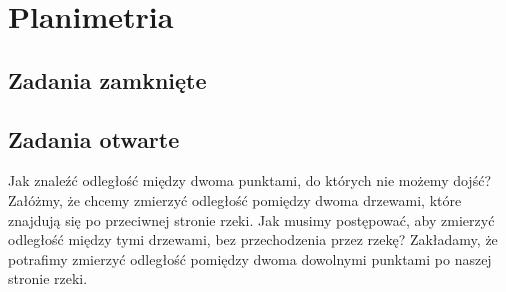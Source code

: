 \setcounter{parc}{0}
\addtocounter{chapc}{1}

\chapter{Planimetria}

\section{Zadania zamknięte}

\section{Zadania otwarte}

\zadanie Jak znaleźć odległość między dwoma punktami, do których nie możemy dojść? Załóżmy, że chcemy zmierzyć odległość pomiędzy dwoma drzewami, które znajdują się po przeciwnej stronie rzeki. Jak musimy postępować, aby zmierzyć odległość między tymi drzewami, bez przechodzenia przez rzekę? Zakładamy, że potrafimy zmierzyć odległość pomiędzy dwoma dowolnymi punktami po naszej stronie rzeki.